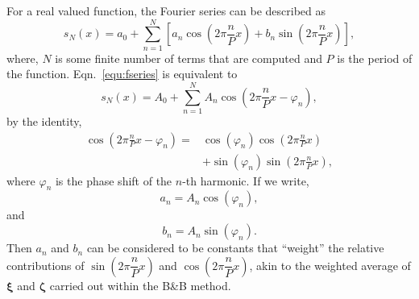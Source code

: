 \documentclass[reprint,superscriptaddress,nobibnotes,amsmath,amssymb,aip]{revtex4-2}
\begin{document}
For a real valued function, the Fourier series can be described as 
%
\begin{equation}
    s_N(x) = a_0 + \sum_{n=1}^{N} \left[ a_n \cos \left( 2\pi \frac{n}{P} x \right) + b_n \sin \left( 2\pi \frac{n}{P} x \right) \right],
    \label{equ:fseries}
\end{equation}
%
where, $N$ is some finite number of terms that are computed and $P$ is the period of the function. 
Eqn.~\ref{equ:fseries} is equivalent to
%
\begin{equation}
    s_N(x) = A_0 + \sum_{n=1}^{N} A_n \cos\left(2\pi \frac{n}{P}x - \varphi_n\right),
\end{equation}
%
by the identity, 
%
\begin{equation}
    \begin{aligned}
        \cos \left( 2\pi \frac{n}{P} x - \varphi_n \right) = & \cos(\varphi_n) \cos \left( 2\pi \frac{n}{P} x \right)  \\ 
        & + \sin(\varphi_n) \sin \left( 2\pi \frac{n}{P} x \right),
    \end{aligned}
\end{equation}
where $\varphi_n$ is the phase shift of the $n$-th harmonic. 
If we write, 
%
\begin{equation}
    a_n = A_n \cos(\varphi_n),
\end{equation}
%
and
%
\begin{equation}
    b_n = A_n \sin(\varphi_n).
\end{equation}
%
Then $a_n$ and $b_n$ can be considered to be constants that ``weight'' the relative contributions of $\sin \left( 2\pi \dfrac{n}{P} x \right)$ and $\cos \left( 2\pi \dfrac{n}{P} x \right)$, akin to the weighted average of $\bm{\xi}$ and $\bm{\zeta}$ carried out within the B\&B method.
\end{document}
